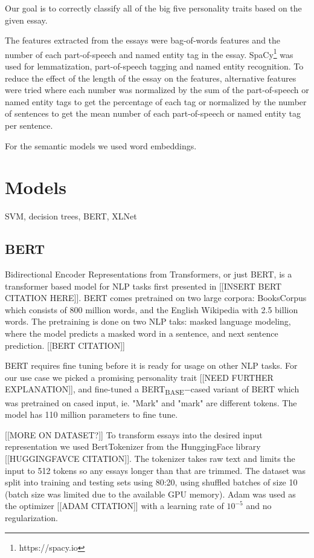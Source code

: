 \documentclass[10pt, a4paper]{article}
\begin{document}
Our goal is to correctly classify all of the big five personality traits based on the given essay.

The features extracted from the essays were bag-of-words features and the number of each part-of-speech and named entity tag in the essay.
SpaCy\footnote{https://spacy.io} was used for lemmatization, part-of-speech tagging and named entity recognition.
To reduce the effect of the length of the essay on the features, alternative features were tried where each number was normalized by the sum of the part-of-speech or named entity tags to get the percentage of each tag or normalized by the number of sentences to get the mean number of each part-of-speech or named entity tag per sentence.

For the semantic models we used word embeddings.

\section{Models}
SVM, decision trees, BERT, XLNet

\subsection{BERT}

Bidirectional Encoder Representations from Transformers, or just BERT, is a transformer based model for NLP tasks first presented in [[INSERT BERT CITATION HERE]]. BERT comes pretrained on two large corpora: BooksCorpus which consists of 800 million words, and the English Wikipedia with 2.5 billion words. The pretraining is done on two NLP taks: masked language modeling, where the model predicts a masked word in a sentence, and next sentence prediction. [[BERT CITATION]]

BERT requires fine tuning before it is ready for usage on other NLP tasks. For our use case we picked a promising personality trait [[NEED FURTHER EXPLANATION]], and fine-tuned a BERT\textsubscript{BASE}$-$cased variant of BERT which was pretrained on cased input, ie. "Mark" and "mark" are different tokens. The model has 110 million parameters to fine tune.

[[MORE ON DATASET?]] To transform essays into the desired input representation we used BertTokenizer from the HunggingFace library [[HUGGINGFAVCE CITATION]]. The tokenizer takes raw text and limits the input to 512 tokens so any essays longer than that are trimmed. The dataset was split into training and testing sets using 80:20, using shuffled batches of size 10 (batch size was limited due to the available GPU memory). Adam was used as the optimizer [[ADAM CITATION]] with a learning rate of $10^{-5}$ and no regularization.
\end{document}
